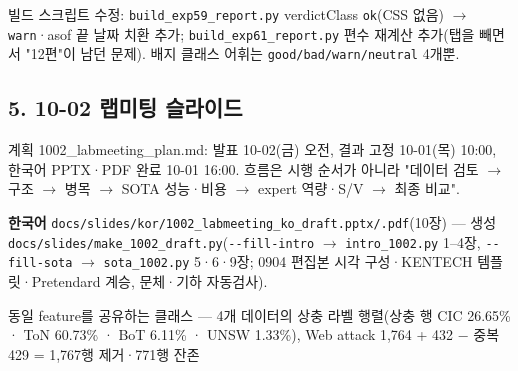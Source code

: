 \par\noindent \textbullet\enspace 빌드 스크립트 수정: \texttt{build\_\allowbreak{}\allowbreak{}ex\allowbreak{}p59\_\allowbreak{}\allowbreak{}repo\allowbreak{}rt.\allowbreak{}py} verdictClass \texttt{ok}(CSS 없음) \ensuremath{\rightarrow} \texttt{warn}·asof 끝 날짜 치환 추가; \texttt{build\_\allowbreak{}\allowbreak{}ex\allowbreak{}p61\_\allowbreak{}\allowbreak{}repo\allowbreak{}rt.\allowbreak{}py} 편수 재계산 추가(탭을 빼면서 "12편"이 남던 문제). 배지 클래스 어휘는 \texttt{good/\allowbreak{}\allowbreak{}bad\allowbreak{}/\allowbreak{}\allowbreak{}warn/\allowbreak{}\allowbreak{}ne\allowbreak{}utral} 4개뿐.


\subsection{5. 10-02 랩미팅 슬라이드}
계획 1002\_\allowbreak{}labmeeting\_\allowbreak{}plan.md: 발표 10-02(금) 오전, 결과 고정 10-01(목) 10:00, 한국어 PPTX·PDF 완료 10-01 16:00. 흐름은 시행 순서가 아니라 "데이터 검토  \ensuremath{\rightarrow}  구조  \ensuremath{\rightarrow}  병목  \ensuremath{\rightarrow}  SOTA 성능·비용  \ensuremath{\rightarrow}  expert 역량·S/\allowbreak{}V  \ensuremath{\rightarrow}  최종 비교".

\par\noindent \textbullet\enspace \textbf{한국어} \texttt{docs/\allowbreak{}\allowbreak{}sli\allowbreak{}des/\allowbreak{}\allowbreak{}kor/\allowbreak{}\allowbreak{}1002\_\allowbreak{}\allowbreak{}lab\allowbreak{}meeting\_\allowbreak{}\allowbreak{}ko\_\allowbreak{}\allowbreak{}draft\allowbreak{}.\allowbreak{}pptx/\allowbreak{}\allowbreak{}.\allowbreak{}p\allowbreak{}df}(10장) — 생성 \texttt{docs/\allowbreak{}\allowbreak{}sli\allowbreak{}des/\allowbreak{}\allowbreak{}make\allowbreak{}\_\allowbreak{}\allowbreak{}1002\_\allowbreak{}\allowbreak{}dr\allowbreak{}aft.\allowbreak{}py}(\texttt{-\allowbreak{}-\allowbreak{}fill-\allowbreak{}i\allowbreak{}ntro}  \ensuremath{\rightarrow}  \texttt{intro\_\allowbreak{}\allowbreak{}10\allowbreak{}02.\allowbreak{}py} 1–4장, \texttt{-\allowbreak{}-\allowbreak{}fill-\allowbreak{}s\allowbreak{}ota}  \ensuremath{\rightarrow}  \texttt{sota\_\allowbreak{}\allowbreak{}100\allowbreak{}2.\allowbreak{}py} 5·6·9장; 0904 편집본 시각 구성·KENTECH 템플릿·Pretendard 계승, 문체·기하 자동검사).

\par\noindent \textbullet\enspace 동일 feature를 공유하는 클래스 — 4개 데이터의 상충 라벨 행렬(상충 행 CIC 26.65\% · ToN 60.73\% · BoT 6.11\% · UNSW 1.33\%), Web attack 1,764 +\allowbreak{} 432 − 중복 429 =\allowbreak{} 1,767행 제거·771행 잔존


